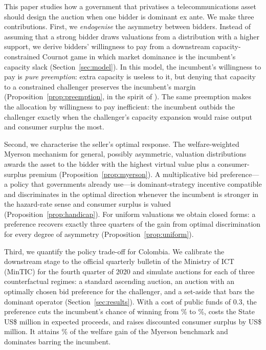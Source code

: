 \documentclass[12pt,a4paper]{article}
\theoremstyle{definition}
\theoremstyle{remark}
\newcommand{\us}{US\$}
\begin{document}
This paper studies how a government that privatises a telecommunications asset should design the auction when one bidder is dominant ex ante. We make three contributions. First, we \emph{endogenise} the asymmetry between bidders. Instead of assuming that a strong bidder draws valuations from a distribution with a higher support, we derive bidders' willingness to pay from a downstream capacity-constrained Cournot game in which market dominance is the incumbent's capacity slack (Section~\ref{sec:model}). In this model, the incumbent's willingness to pay is \emph{pure preemption}: extra capacity is useless to it, but denying that capacity to a constrained challenger preserves the incumbent's margin (Proposition~\ref{prop:preemption}, in the spirit of \citealt{gilbertnewbery1982}). The same preemption makes the allocation by willingness to pay inefficient: the incumbent outbids the challenger exactly when the challenger's capacity expansion would raise output and consumer surplus the most.

Second, we characterise the seller's optimal response. The welfare-weighted Myerson mechanism for general, possibly asymmetric, valuation distributions \citep{myerson1981,bulowroberts1989} awards the asset to the bidder with the highest virtual value plus a consumer-surplus premium (Proposition~\ref{prop:myerson}). A multiplicative bid preference---a policy that governments already use---is dominant-strategy incentive compatible and discriminates in the optimal direction whenever the incumbent is stronger in the hazard-rate sense and consumer surplus is valued (Proposition~\ref{prop:handicap}). For uniform valuations we obtain closed forms: a preference recovers exactly three quarters of the gain from optimal discrimination for every degree of asymmetry (Proposition~\ref{prop:uniform}).

Third, we quantify the policy trade-off for Colombia. We calibrate the downstream stage to the official quarterly bulletin of the Ministry of ICT (MinTIC) for the fourth quarter of 2020 and simulate \nEval{} auctions for each of three counterfactual regimes: a standard ascending auction, an auction with an optimally chosen bid preference for the challenger, and a set-aside that bars the dominant operator (Section~\ref{sec:results}). With a cost of public funds of 0.3, the preference cuts the incumbent's chance of winning from \pDStd\% to \pDPref\%, costs the State \us\netDropPref{} million in expected proceeds, and raises discounted consumer surplus by \us\csGainPrefVsStd{} million. It attains \shareMyerson\% of the welfare gain of the Myerson benchmark and dominates barring the incumbent.
\end{document}
